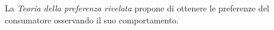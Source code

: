La \emph{Teoria della preferenza rivelata} propone di ottenere le preferenze 
del consumatore osservando il suo comportamento.



\begin{comment}
 
== Voci correlate ==
* [[Ricavo]]
* [[Prezzo]]
* [[Costo marginale]]
* [[Utilità marginale]]
* [[Produttività marginale]]
* [[Moltiplicatore monetario]]
* [[Rendita finanziaria]]
* [[Avversione al rischio]]

== Altri progetti ==
{{
interprogetto|wikt|v=Materia:Microeconomia|v_preposizione=sulla|etichetta=microe
conomia}}

== Collegamenti esterni ==
* {{Thesaurus BNCF}}
{{Controllo di autorità}}
{{Portale|economia}}

[[Categoria:Microeconomia| ]]






\section{Note}
<references />

== Bibliografia ==
* {{cita libro|autore=Pierluigi Ciocca|titolo=Il tempo dell'economia. 
Strutture, fatti, interpreti del Novecento|editore=Bollati 
Boringhieri|anno=2004, ISBN 978-88-339-1559-3}}
* {{cita libro|autore=Sidney Pollard|titolo=L'economia internazionale dal 
1945 ad oggi|editore=Editori Laterza|anno=1999 |ISBN= 88-420-5791-6}}
* {{cita libro|autore=André Gauthier|titolo=L'economia mondiale dal 1945 
a oggi|editore=Il Mulino|anno=1998 |ISBN= 88-15-06381-1}}

== Voci correlate ==
{{div col|cols=4}}
* Autarchia
* Capitalismo
* Commercio
* Dirigismo
* Economia aziendale
* Economia del benessere
* Economia del lavoro
* Economia della conoscenza
* Economia dell'informazione
* Economia dello sviluppo
* Economia d'Italia
* Economia di mercato
* Economia e politica agraria
* Economia finanziaria
* Economia industriale
* Economia internazionale
* Economia keynesiana
* Economia mista
* Economia mondiale
* Economia monetaria
* Economia neoclassica
* Economia pianificata
* Economia politica
* Economisti classici
* Finanza
* Fisiocrazia
* Globalizzazione
* Glossario economico
* Liberismo
* Macroeconomia
* Marginalismo
* Mercantilismo
* Mercato
* Microeconomia
* Monetarismo
* Politica
* Politica economica
* Settore economico
* Statalismo
* Statistica economica
* Storia del pensiero economico
* Storia economica
{{div col end}}


\end{comment}
